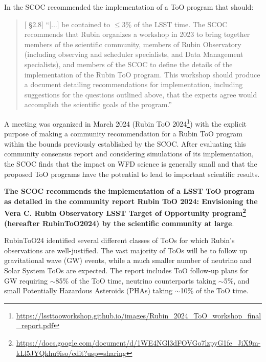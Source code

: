 In  the SCOC recommended the implementation of a ToO program that should:

\begin{quote}
    {[ \S2.8] ``[...] be contained to $\leq$3\% of the LSST time. The SCOC recommends that Rubin organizes a workshop in 2023 to bring together members of the scientific community, members of Rubin Observatory (including observing and scheduler specialists, and Data Management specialists), and members of the SCOC to define the details of the implementation of the Rubin ToO program. This workshop should produce a document detailing recommendations for implementation, including suggestions for the questions outlined above, that the experts agree would accomplish the scientific goals of the program.''}
\end{quote}

A meeting was organized in March 2024 (Rubin ToO 2024\footnote{\url{https://lssttooworkshop.github.io/images/Rubin_2024_ToO_workshop_final_report.pdf}}) with the explicit purpose of making a community recommendation for a Rubin ToO program within the bounds previously established by the SCOC. After evaluating this community consensus report and considering simulations of its implementation, the SCOC finds that the impact on WFD science is generally small and that the proposed ToO programs have the potential to lead to important scientific results. 

 {\bf The SCOC recommends the implementation of a LSST ToO program as detailed in the community report Rubin ToO 2024: 
Envisioning the Vera C. Rubin Observatory LSST Target of Opportunity program\footnote{\url{https://docs.google.com/document/d/1WE4NGl3dFOVGo7lzpyG1fe_JiX9m-kLl5JYQkhu9iso/edit?usp=sharing}} (hereafter RubinToO2024) by the scientific community at large}. 

RubinToO24 identified several different classes of ToOs for which Rubin's observations are well-justified. The vast majority of ToOs will be to follow up gravitational wave (GW) events, while a much smaller number of neutrino and Solar System ToOs are expected. 
The report includes ToO follow-up plans for GW requiring \mbox{$\sim$85\%} of the ToO time, neutrino counterparts taking \mbox{$\sim$5\%}, and small Potentially Hazardous Asteroids (PHAs) taking \mbox{$\sim$10\%} of the ToO time. 


